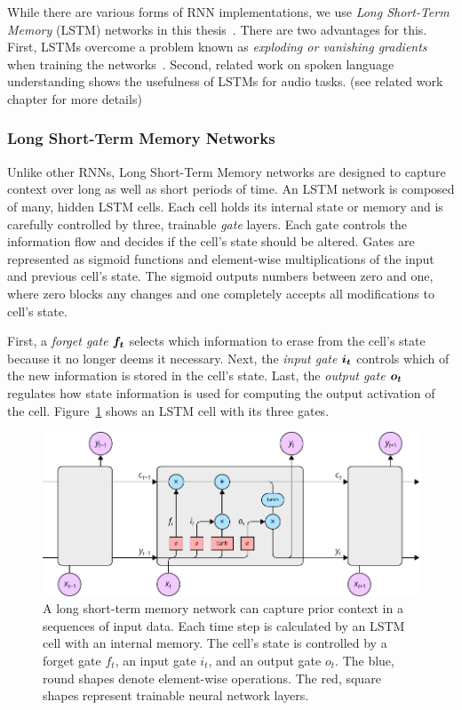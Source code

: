 	While there are various forms of RNN implementations, we use \emph{Long Short-Term Memory} (LSTM) networks in this thesis~\cite{hochreiter1997long}. There are two advantages for this. First, LSTMs overcome a problem known as  \emph{exploding or vanishing gradients} when training the networks~\cite[p.~288]{Goodfellow-et-al-2016}. Second, related work on spoken language understanding shows the usefulness of LSTMs for audio tasks. (see related work chapter for more details)

\subsubsection{Long Short-Term Memory Networks}
Unlike other RNNs, Long Short-Term Memory networks are designed to capture context over long as well as short periods of time. An LSTM network is composed of many, hidden LSTM cells. Each cell holds its internal state or memory and is carefully controlled by three, trainable \emph{gate} layers. Each gate controls the information flow and decides if the cell's state should be altered. Gates are represented as sigmoid functions and element-wise multiplications of the input and previous cell's state. The sigmoid outputs numbers between zero and one, where zero blocks any changes and one completely accepts all modifications to cell's state.

First, a \emph{forget gate} $\boldsymbol{f_t}$ selects which information to erase from the cell's state because it no longer deems it necessary. Next, the \emph{input gate} $\boldsymbol{i_t}$ controls which of the new information is stored in the cell's state. Last, the \emph{output gate} $\boldsymbol{o_t}$ regulates how state information is used for computing the output activation of the cell. Figure~\ref{fig:lstm} shows an LSTM cell with its three gates.
%
	\begin{figure}[tp]
  		\centering
    	\includegraphics{img/lstm.pdf}
    	\caption{A long short-term memory network can capture prior context in a sequences of input data. Each time step is calculated by an LSTM cell with an internal memory. The cell's state is controlled by a forget gate $f_t$, an input gate $i_t$, and an output gate $o_t$. The blue, round shapes denote element-wise operations. The red, square shapes represent trainable neural network layers.}
    	\label{fig:lstm}
	\end{figure}
%

